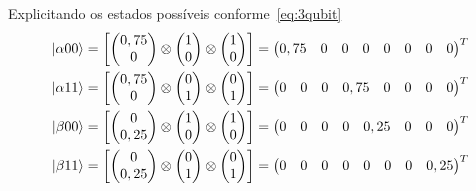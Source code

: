 Explicitando os estados possíveis conforme~\eqref{eq:3qubit}
\begin{equation}
	\begin{split}
\ket{\alpha00} &= \left[ \begin{pmatrix}
0,75 \\
0
\end{pmatrix} \otimes \begin{pmatrix}
1 \\
0
\end{pmatrix} \otimes \begin{pmatrix}
1 \\
0
\end{pmatrix}\right] = \begin{pmatrix}
0,75 & 0 & 0 & 0 & 0 & 0 & 0 & 0
\end{pmatrix}^T \\
\ket{\alpha11} &= \left[ \begin{pmatrix}
0,75 \\
0
\end{pmatrix} \otimes \begin{pmatrix}
0 \\
1
\end{pmatrix} \otimes \begin{pmatrix}
0 \\
1
\end{pmatrix}\right] = \begin{pmatrix}
0 & 0 & 0 & 0,75 & 0 & 0 & 0 & 0
\end{pmatrix}^T \\
\ket{\beta00} &= \left[ \begin{pmatrix}
0 \\
0,25
\end{pmatrix} \otimes \begin{pmatrix}
1 \\
0
\end{pmatrix} \otimes \begin{pmatrix}
1 \\
0
\end{pmatrix}\right] = \begin{pmatrix}
0 & 0 & 0 & 0 & 0,25 & 0 & 0 & 0
\end{pmatrix}^T \\
\ket{\beta11} &=\left[ \begin{pmatrix}
0 \\
0,25
\end{pmatrix} \otimes \begin{pmatrix}
0 \\
1
\end{pmatrix} \otimes \begin{pmatrix}
0 \\
1
\end{pmatrix}\right] = \begin{pmatrix}
0 & 0 & 0 & 0 & 0 & 0 & 0 & 0,25
\end{pmatrix}^T
	\end{split}
\end{equation}
